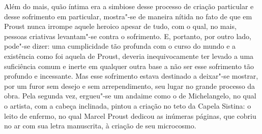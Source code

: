 Além do mais, quão íntima era a simbiose desse processo de criação
particular e desse sofrimento em particular, mostra"-se de maneira nítida
no fato de que em Proust nunca irrompe aquele heroico apesar de tudo,
com o qual, no mais, pessoas criativas levantam"-se contra o sofrimento.
E, portanto, por outro lado, pode"-se dizer: uma cumplicidade tão
profunda com o curso do mundo e a existência como foi aquela de Proust,
deveria inequivocamente ter levado a uma suficiência comum e inerte em
qualquer outra base a não ser esse sofrimento tão profundo e incessante.
Mas esse sofrimento estava destinado a deixar"-se mostrar, por um furor
sem desejo e sem arrependimento, seu lugar no grande processo da obra.
Pela segunda vez, ergueu"-se um andaime como o de Michelangelo, no qual o
artista, com a cabeça inclinada, pintou a criação no teto da Capela
Sistina: o leito de enfermo, no qual Marcel Proust dedicou as inúmeras
páginas, que cobriu no ar com sua letra manuscrita, à criação de seu
microcosmo.

